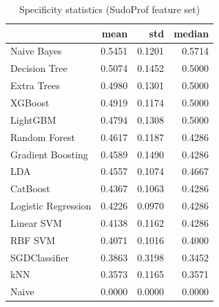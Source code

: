 \begin{table}
\caption{Specificity statistics (SudoProf feature set)}
\label{tab:specificity_SudoProf_stats}
\begin{tabular}{lrrr}
\toprule
 & mean & std & median \\
\midrule
Naive Bayes & 0.5451 & 0.1201 & 0.5714 \\
Decision Tree & 0.5074 & 0.1452 & 0.5000 \\
Extra Trees & 0.4980 & 0.1301 & 0.5000 \\
XGBoost & 0.4919 & 0.1174 & 0.5000 \\
LightGBM & 0.4794 & 0.1308 & 0.5000 \\
Random Forest & 0.4617 & 0.1187 & 0.4286 \\
Gradient Boosting & 0.4589 & 0.1490 & 0.4286 \\
LDA & 0.4557 & 0.1074 & 0.4667 \\
CatBoost & 0.4367 & 0.1063 & 0.4286 \\
Logistic Regression & 0.4226 & 0.0970 & 0.4286 \\
Linear SVM & 0.4138 & 0.1162 & 0.4286 \\
RBF SVM & 0.4071 & 0.1016 & 0.4000 \\
SGDClassifier & 0.3863 & 0.3198 & 0.3452 \\
kNN & 0.3573 & 0.1165 & 0.3571 \\
Naive & 0.0000 & 0.0000 & 0.0000 \\
\bottomrule
\end{tabular}
\end{table}
